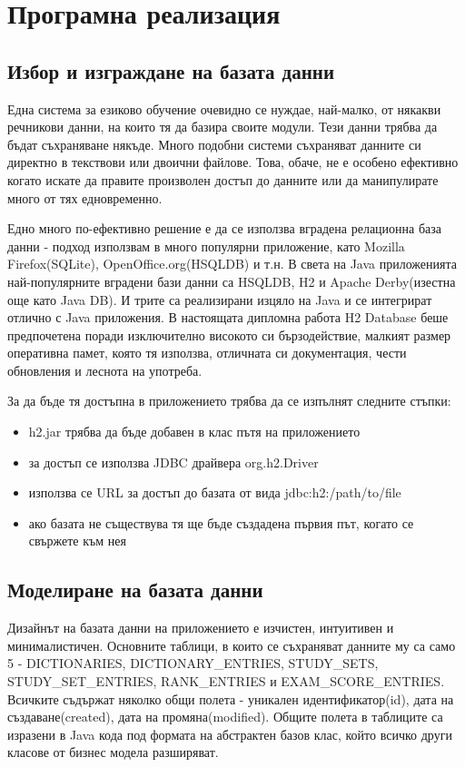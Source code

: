 \chapter{Програмна реализация}
\section{Избор и изграждане на базата данни}

Една система за езиково обучение очевидно се нуждае, най-малко, от
някакви речникови данни, на които тя да базира своите модули. Тези
данни трябва да бъдат съхраняване някъде. Много подобни системи
съхраняват данните си директно в текствови или двоични файлове. Това,
обаче, не е особено ефективно когато искате да правите произволен
достъп до данните или да манипулирате много от тях едновременно. 

Едно много по-ефективно решение е да се използва вградена релационна
база данни - подход използвам в много популярни приложение, като
Mozilla Firefox(SQLite), OpenOffice.org(HSQLDB) и т.н. В света на Java
приложенията най-популярните вградени бази данни са HSQLDB, H2 и Apache
Derby(изестна още като Java DB). И трите са реализирани изцяло на Java
и се интегрират отлично с Java приложения. В настоящата дипломна работа H2
Database беше предпочетена поради изключително високото си
бързодействие, малкият размер оперативна памет, която тя използва,
отличната си документация, чести обновления и леснота на употреба.

За да бъде тя достъпна в приложението трябва да се изпълнят следните
стъпки: 
\begin{itemize}
  \item h2.jar трябва да бъде добавен в клас пътя на приложението 
  \item за достъп се използва JDBC драйвера org.h2.Driver
  \item използва се URL за достъп до базата от вида
    jdbc:h2:/path/to/file
  \item ако базата не съществува тя ще бъде създадена първия път,
    когато се свържете към нея
\end{itemize} 
\section{Моделиране на базата данни}

Дизайнът на базата данни на приложението е изчистен, интуитивен и
минималистичен. Основните таблици, в които се съхраняват данните му са
само 5 - DICTIONARIES, DICTIONARY\_ENTRIES, STUDY\_SETS,
STUDY\_SET\_ENTRIES, RANK\_ENTRIES и EXAM\_SCORE\_ENTRIES. Всичките
съдържат няколко общи полета - уникален идентификатор(id), дата на
създаване(created), дата на промяна(modified). Общите полета в
таблиците са изразени в Java кода под формата на абстрактен базов
клас, който всичко други класове от бизнес модела разширяват. 

